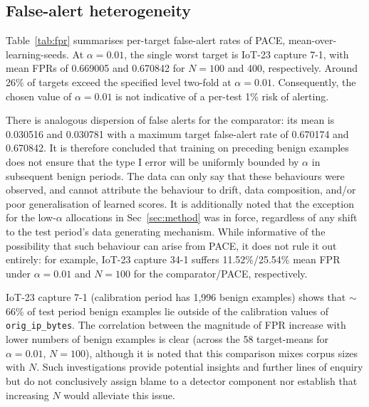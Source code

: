 \subsection{False-alert heterogeneity} 
Table~\ref{tab:fpr} summarises per-target false-alert rates of PACE, mean-over-learning-seeds. At $\alpha = 0.01$, the single worst target is IoT-23 capture 7-1, with mean FPRs of 0.669005 and 0.670842 for $N = 100$ and 400, respectively. Around 26\% of targets exceed the specified level two-fold at $\alpha=0.01$. Consequently, the chosen value of $\alpha = 0.01$ is not indicative of a per-test 1\% risk of alerting.

\begin{table}[!htbp] 
\centering\small 
\caption{Realised per-target PACE false alert rates over benign test data, mean-over-learning-seeds. Values in the rightmost columns are the proportion of targets whose FPR exceeds the respective multiple of $\alpha$.}
\label{tab:fpr} 
 
\end{table} 

There is analogous dispersion of false alerts for the comparator: its mean is 0.030516 and 0.030781 with a maximum target false-alert rate of 0.670174 and 0.670842. It is therefore concluded that training on preceding benign examples does not ensure that the type I error will be uniformly bounded by $\alpha$ in subsequent benign periods. The data can only say that these behaviours were observed, and cannot attribute the behaviour to drift, data composition, and/or poor generalisation of learned scores. It is additionally noted that the exception for the low-$\alpha$ allocations in Sec~\ref{sec:method} was in force, regardless of any shift to the test period's data generating mechanism. While informative of the possibility that such behaviour can arise from PACE, it does not rule it out entirely: for example, IoT-23 capture 34-1 suffers 11.52\%/25.54\% mean FPR under $\alpha=0.01$ and $N=100$ for the comparator/PACE, respectively.

IoT-23 capture 7-1 (calibration period has 1,996 benign examples) shows that $\sim$66\% of test period benign examples lie outside of the calibration values of \texttt{orig\_ip\_bytes}. The correlation between the magnitude of FPR increase with lower numbers of benign examples is clear (across the 58 target-means for $\alpha = 0.01$, $N=100$), although it is noted that this comparison mixes corpus sizes with $N$. Such investigations provide potential insights and further lines of enquiry but do not conclusively assign blame to a detector component nor establish that increasing $N$ would alleviate this issue.

